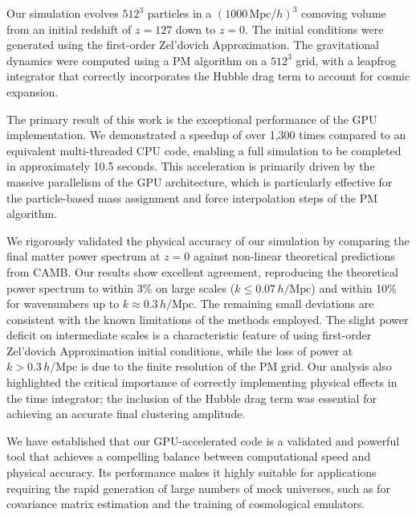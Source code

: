 \documentclass[]{article}
\begin{document}
Our simulation evolves $512^3$ particles in a $(1000 \, \text{Mpc}/h)^3$ comoving volume from an initial redshift of $z=127$ down to $z=0$. The initial conditions were generated using the first-order Zel'dovich Approximation. The gravitational dynamics were computed using a PM algorithm on a $512^3$ grid, with a leapfrog integrator that correctly incorporates the Hubble drag term to account for cosmic expansion.

The primary result of this work is the exceptional performance of the GPU implementation. We demonstrated a speedup of over 1,300 times compared to an equivalent multi-threaded CPU code, enabling a full simulation to be completed in approximately 10.5 seconds. This acceleration is primarily driven by the massive parallelism of the GPU architecture, which is particularly effective for the particle-based mass assignment and force interpolation steps of the PM algorithm.

We rigorously validated the physical accuracy of our simulation by comparing the final matter power spectrum at $z=0$ against non-linear theoretical predictions from CAMB. Our results show excellent agreement, reproducing the theoretical power spectrum to within 3\% on large scales ($k \le 0.07 \, h/\text{Mpc}$) and within 10\% for wavenumbers up to $k \approx 0.3 \, h/\text{Mpc}$. The remaining small deviations are consistent with the known limitations of the methods employed. The slight power deficit on intermediate scales is a characteristic feature of using first-order Zel'dovich Approximation initial conditions, while the loss of power at $k > 0.3 \, h/\text{Mpc}$ is due to the finite resolution of the PM grid. Our analysis also highlighted the critical importance of correctly implementing physical effects in the time integrator; the inclusion of the Hubble drag term was essential for achieving an accurate final clustering amplitude.

We have established that our GPU-accelerated code is a validated and powerful tool that achieves a compelling balance between computational speed and physical accuracy. Its performance makes it highly suitable for applications requiring the rapid generation of large numbers of mock universes, such as for covariance matrix estimation and the training of cosmological emulators.


{}

\end{document}
